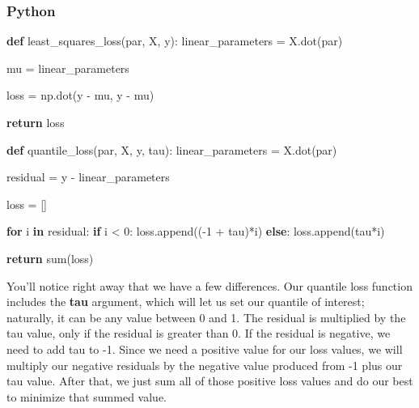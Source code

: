 \documentclass[
  letterpaper,
]{krantz}
\newenvironment{Shaded}{}{}
\newcommand{\BuiltInTok}[1]{\textcolor[rgb]{0.00,0.50,0.00}{#1}}
\newcommand{\ControlFlowTok}[1]{\textcolor[rgb]{0.00,0.44,0.13}{\textbf{#1}}}
\newcommand{\DecValTok}[1]{\textcolor[rgb]{0.25,0.63,0.44}{#1}}
\newcommand{\KeywordTok}[1]{\textcolor[rgb]{0.00,0.44,0.13}{\textbf{#1}}}
\newcommand{\NormalTok}[1]{#1}
\newcommand{\OperatorTok}[1]{\textcolor[rgb]{0.40,0.40,0.40}{#1}}
\begin{document}
\subsubsection{Python}

\begin{Shaded}
\begin{Highlighting}[]
\KeywordTok{def}\NormalTok{ least\_squares\_loss(par, X, y):}
\NormalTok{  linear\_parameters }\OperatorTok{=}\NormalTok{ X.dot(par)}
  
\NormalTok{  mu }\OperatorTok{=}\NormalTok{ linear\_parameters}
  
\NormalTok{  loss }\OperatorTok{=}\NormalTok{ np.dot(y }\OperatorTok{{-}}\NormalTok{ mu, y }\OperatorTok{{-}}\NormalTok{ mu)}
  
  \ControlFlowTok{return}\NormalTok{ loss}
\end{Highlighting}
\end{Shaded}

\begin{Shaded}
\begin{Highlighting}[]
\KeywordTok{def}\NormalTok{ quantile\_loss(par, X, y, tau):}
\NormalTok{  linear\_parameters }\OperatorTok{=}\NormalTok{ X.dot(par)}
  
\NormalTok{  residual }\OperatorTok{=}\NormalTok{ y }\OperatorTok{{-}}\NormalTok{ linear\_parameters}
  
\NormalTok{  loss }\OperatorTok{=}\NormalTok{ []}

  \ControlFlowTok{for}\NormalTok{ i }\KeywordTok{in}\NormalTok{ residual:}
    \ControlFlowTok{if}\NormalTok{ i }\OperatorTok{\textless{}} \DecValTok{0}\NormalTok{: loss.append((}\OperatorTok{{-}}\DecValTok{1} \OperatorTok{+}\NormalTok{ tau)}\OperatorTok{*}\NormalTok{i)}
    \ControlFlowTok{else}\NormalTok{: loss.append(tau}\OperatorTok{*}\NormalTok{i)}
  
  \ControlFlowTok{return} \BuiltInTok{sum}\NormalTok{(loss)}
\end{Highlighting}
\end{Shaded}

You'll notice right away that we have a few differences. Our quantile
loss function includes the \textbf{tau} argument, which will let us set
our quantile of interest; naturally, it can be any value between 0 and
1. The residual is multiplied by the tau value, only if the residual is
greater than 0. If the residual is negative, we need to add tau to -1.
Since we need a positive value for our loss values, we will multiply our
negative residuals by the negative value produced from -1 plus our tau
value. After that, we just sum all of those positive loss values and do
our best to minimize that summed value.
\end{document}
